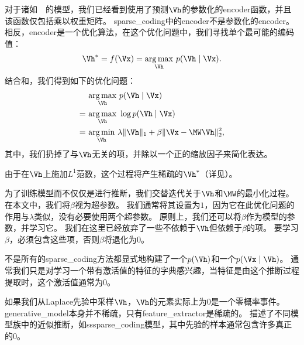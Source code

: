 对于诸如~~的模型，我们已经看到使用了预测$\Vh$的参数化的\gls{encoder}函数，并且该函数仅包括乘以权重矩阵。
\gls{sparse_coding}中的\gls{encoder}不是参数化的\gls{encoder}。
相反，\gls{encoder}是一个优化算法，在这个优化问题中，我们寻找单个最可能的编码值：
\begin{align}
\label{eqn:1315}
\Vh^* = f(\Vx) = \underset{\Vh}{\arg\max}\  p(\Vh\mid\Vx).
\end{align} %
结合和，我们得到如下的优化问题：
\begin{align}
\label{eqn:1316}
& \underset{\Vh}{\arg\max}\  p(\Vh\mid\Vx) \\
= ~& \underset{\Vh}{\arg\max}\ \log  p(\Vh\mid\Vx)\\
= ~& \underset{\Vh}{\arg\min}\ \lambda \Vert \Vh\Vert_1 + \beta  \Vert \Vx - \MW \Vh\Vert_2^2,
\end{align}
其中，我们扔掉了与$\Vh$无关的项，并除以一个正的缩放因子来简化表达。

由于在$\Vh$上施加$L^1$范数，这个过程将产生稀疏的$\Vh^*$（详见）。


为了训练模型而不仅仅是进行推断，我们交替迭代关于$\Vh$和$\MW$的最小化过程。
在本文中，我们将$\beta$视为超参数。
我们通常将其设置为$1$，因为它在此优化问题的作用与$\lambda$类似，没有必要使用两个超参数。 
原则上，我们还可以将$\beta$作为模型的参数，并学习它。
我们在这里已经放弃了一些不依赖于$\Vh$但依赖于$\beta$的项。
要学习$\beta$，必须包含这些项，否则$\beta$将退化为$0$。


不是所有的\gls{sparse_coding}方法都显式地构建了一个$p(\Vh)$和一个$p(\Vx\mid\Vh)$。 
通常我们只是对学习一个带有激活值的特征的字典感兴趣，当特征是由这个推断过程提取时，这个激活值通常为$0$。

如果我们从Laplace先验中采样$\Vh$，$\Vh$的元素实际上为$0$是一个零概率事件。
\gls{generative_model}本身并不稀疏，只有\gls{feature_extractor}是稀疏的。
\citet{Goodfeli-et-al-TPAMI-Deep-PrePrint-2013-small}描述了不同模型族中的近似推断，如\gls{ss}\gls{sparse_coding}模型，其中先验的样本通常包含许多真正的$0$。

